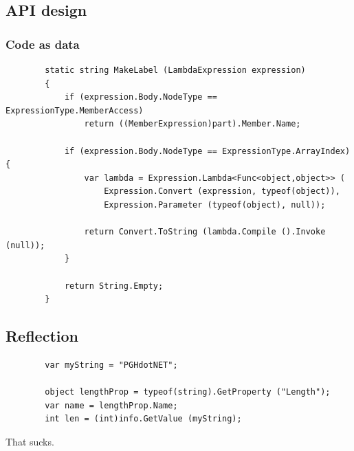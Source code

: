 \documentclass{beamer}
\begin{document}
\subsection{API design}
	\begin{frame}
	\end{frame}
	\begin{frame}[fragile]
		\frametitle{Code as data}
		\begin{verbatim}
		static string MakeLabel (LambdaExpression expression)
		{
		    if (expression.Body.NodeType == ExpressionType.MemberAccess)
		        return ((MemberExpression)part).Member.Name;

		    if (expression.Body.NodeType == ExpressionType.ArrayIndex) {
		        var lambda = Expression.Lambda<Func<object,object>> (
		            Expression.Convert (expression, typeof(object)),
		            Expression.Parameter (typeof(object), null));

		        return Convert.ToString (lambda.Compile ().Invoke (null));
		    }

		    return String.Empty;
		}
		\end{verbatim}
	\end{frame}

\subsection{Reflection}
	\begin{frame}[fragile]
		\begin{verbatim}
		var myString = "PGHdotNET";

		object lengthProp = typeof(string).GetProperty ("Length");
		var name = lengthProp.Name;
		int len = (int)info.GetValue (myString);
		\end{verbatim}
	\end{frame}

	\begin{frame}
		\Huge That sucks.
	\end{frame}
\end{document}
